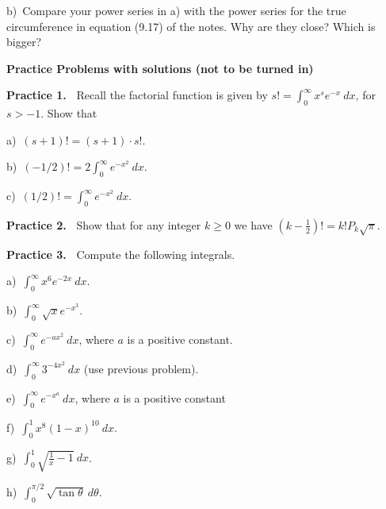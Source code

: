 \documentclass[12pt]{article}
\theoremstyle{definition}
\theoremstyle{remark}
\theoremstyle{definition}
\newenvironment{Solution}{\noindent\textbf{Solution.}}{}
\begin{document}
b)\ Compare your power series in a) with the power series for the true circumference in equation (9.17) of the notes. Why are they close? Which is bigger?






\newpage
{\bf Practice Problems with solutions (not to be turned in)}

{\bf Practice 1.\ }  Recall the factorial function is given by $s!=\displaystyle \int_0^\infty x^s e^{-x}\ dx$, for $s>-1$. Show that 

a)\ $(s+1)!=(s+1)\cdot s!$. 

b)\ $(-1/2)!=2\int_0^\infty e^{-x^2}\ dx$. 

c)\ $(1/2)!=\int_0^\infty e^{-x^2}\ dx$. 




\vskip10pt
{\bf Practice 2.\ } 
Show that for any integer $k\geq 0$ we have 
$\left(k-\frac{1}{2}\right)!= k! P_k \sqrt{\pi}$.

\vskip10pt
{\bf Practice 3.\ } Compute the following integrals.

a)\ $\int_0^\infty x^6 e^{-2x}\ dx$.

b)\ $\int_0^\infty \sqrt{x} e^{-x^3}$.

c)\ $\int_0^\infty e^{-ax^2}\ dx$, where $a$ is a positive constant.

d)\ $\int_0^\infty 3^{-4x^2}\ dx$ (use previous problem). 

e)\ $\int_0^\infty e^{-x^a}\ dx$, where $a$ is a positive constant

f)\  $\int_0^1 x^8(1-x)^{10}\ dx$.

g)\ $\int_0^1\sqrt{\frac{1}{x}-1}\ dx$.

h)\ $\int_0^{\pi/2}\sqrt{\tan\theta}\ d\theta$. 
\end{document}
